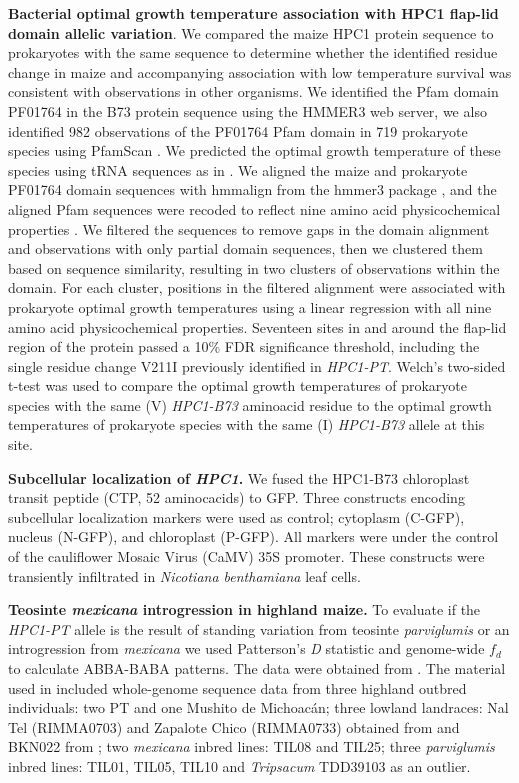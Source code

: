 \documentclass[9pt,twocolumn,twoside,lineno]{BioRxiv}
\begin{document}
\textbf{Bacterial optimal growth temperature association with HPC1 flap-lid domain allelic variation}.
We compared the maize HPC1 protein sequence to prokaryotes with the same sequence to determine whether the identified residue change in maize and accompanying association with low temperature survival was consistent with observations in other organisms. 
We identified the Pfam domain PF01764 in the B73 protein sequence using the HMMER3 web server, we also identified 982 observations of the PF01764 Pfam domain in 719 prokaryote species using PfamScan \cite{Potter2018-tk, El-Gebali2019-pw}. 
We predicted the optimal growth temperature of these species using tRNA sequences as in \cite{Cimen2020-dm}. 
We aligned the maize and prokaryote PF01764 domain sequences with hmmalign from the hmmer3 package \cite{Eddy2011-pd}, and the aligned Pfam sequences were recoded to reflect nine amino acid physicochemical properties \cite{Li2016-ut}. 
We filtered the sequences to remove gaps in the domain alignment and observations with only partial domain sequences, then we clustered them based on sequence similarity, resulting in two clusters of observations within the domain. 
For each cluster, positions in the filtered alignment were associated with prokaryote optimal growth temperatures using a linear regression with all nine amino acid physicochemical properties. 
Seventeen sites in and around the flap-lid region of the protein passed a 10\% FDR significance threshold, including the single residue change V211I previously identified in \textit{HPC1-PT}. 
Welch’s two-sided t-test was used to compare the optimal growth temperatures of prokaryote species with the same (V) \textit{HPC1-B73} aminoacid residue to the optimal growth temperatures of prokaryote species with the same (I) \textit{HPC1-B73} allele at this site.

\textbf{Subcellular localization of \textit{HPC1}.}
We fused the HPC1-B73 chloroplast transit peptide (CTP, 52 aminocacids) to GFP. 
Three constructs encoding subcellular localization markers were used as control; cytoplasm (C-GFP), nucleus (N-GFP), and chloroplast (P-GFP).
All markers were under the control of the cauliflower Mosaic Virus (CaMV) 35S promoter. 
These constructs were transiently infiltrated in \textit{Nicotiana benthamiana} leaf cells.

\textbf{Teosinte \textit{mexicana} introgression in highland maize.}
To evaluate if the \textit{HPC1-PT} allele is the result of standing variation from teosinte \textit{parviglumis} or an introgression from \textit{mexicana} we used Patterson's \textit{D} statistic and genome-wide $f_{d}$ to calculate ABBA-BABA patterns. 
The data were obtained from \cite{Gonzalez-Segovia2019-jy}. 
The material used in \cite{Gonzalez-Segovia2019-jy} included whole-genome sequence data from three highland outbred individuals: two PT and one Mushito de Michoacán; three lowland landraces: Nal Tel (RIMMA0703) and Zapalote Chico (RIMMA0733) obtained from \cite{Wang2017-bc} and  BKN022 from \cite{Bukowski2017-ng}; two \textit{mexicana} inbred lines: TIL08 and TIL25; three \textit{parviglumis} inbred lines: TIL01, TIL05, TIL10 and \textit{Tripsacum} TDD39103 \cite{Bukowski2017-ng} as an outlier. 
\end{document}
